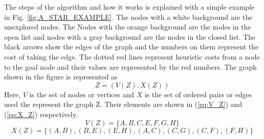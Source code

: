 The steps of the algorithm and how it works is explained with a simple example in Fig. \ref{fig:A_STAR_EXAMPLE}. The nodes with a white background are the unexplored nodes. The Nodes with the orange background are the nodes in the open list and nodes with a gray background are the nodes in the closed list. The black arrows show the edges of the graph and the numbers on them represent the cost of taking the edge. The dotted red lines represent heuristic costs from a node to the goal node and their values are represented by the red numbers. The graph shown in the figure is represented as
\begin{equation}
    Z = ( V(Z), X(Z) )
\end{equation}
Here, $V$ is the set of nodes or vertices and $X$ is the set of ordered pairs or edges used the represent the graph Z. Their elements are shown in (\ref{eq:V_Z}) and (\ref{eq:X_Z}) respectively.
\begin{equation}
\label{eq:V_Z}
    V(Z) = \{A,B,C,E,F,G,H\}
\end{equation}
\begin{equation}
\label{eq:X_Z}
    X(Z) = \{ (A,B), (B,E), (E,H), (A,C), (C,G), (C,F), (F,H) \}
\end{equation}

